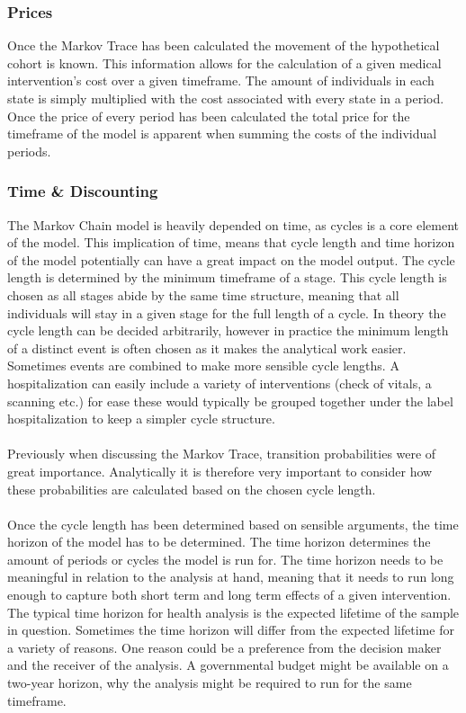 \documentclass[a4paper,12pt]{article}
\begin{document}
\subsubsection*{Prices}
Once the Markov Trace has been calculated the movement of the hypothetical cohort is known. This information allows for the calculation of a given medical intervention’s cost over a given timeframe. The amount of individuals in each state is simply multiplied with the cost associated with every state in a period. Once the price of every period has been calculated the total price for the timeframe of the model is apparent when summing the costs of the individual periods.


\subsubsection*{Time \& Discounting}
The Markov Chain model is heavily depended on time, as cycles is a core element of the model. This implication of time, means that cycle length and time horizon of the model potentially can have a great impact on the model output. The cycle length is determined by the minimum timeframe of a stage. This cycle length is chosen as all stages abide by the same time structure, meaning that all individuals will stay in a given stage for the full length of a cycle. In theory the cycle length can be decided arbitrarily, however in practice the minimum length of a distinct event is often chosen as it makes the analytical work easier. Sometimes events are combined to make more sensible cycle lengths. A hospitalization can easily include a variety of interventions (check of vitals, a scanning etc.) for ease these would typically be grouped together under the label hospitalization to keep a simpler cycle structure. 
\\\\
Previously when discussing the Markov Trace, transition probabilities were of great importance. Analytically it is therefore very important to consider how these probabilities are calculated based on the chosen cycle length.
\\\\
Once the cycle length has been determined based on sensible arguments, the time horizon of the model has to be determined. The time horizon determines the amount of periods or cycles the model is run for. The time horizon needs to be meaningful in relation to the analysis at hand, meaning that it needs to run long enough to capture both short term and long term effects of a given intervention. The typical time horizon for health analysis is the expected lifetime of the sample in question. Sometimes the time horizon will differ from the expected lifetime for a variety of reasons. One reason could be a preference from the decision maker and the receiver of the analysis. A governmental budget might be available on a two-year horizon, why the analysis might be required to run for the same timeframe. 
\end{document}
